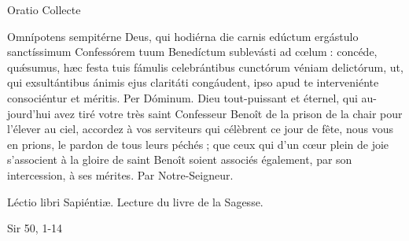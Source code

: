 \begin{paracol}{2}
Oratio
\switchcolumn
Collecte
\switchcolumn*

Omnípotens sempitérne Deus,  qui hodiérna die carnis edúctum ergástulo sanctíssimum Confessórem tuum Benedíctum sublevásti ad cœlum : concéde, quǽsumus, hæc festa tuis fámulis celebrántibus cunctórum véniam delictórum, ut, qui exsultántibus ánimis ejus claritáti congáudent, ipso apud te interveniénte consociéntur et méritis. Per Dóminum.
\switchcolumn
Dieu tout-puissant et éternel, qui au- jourd’hui avez tiré votre très saint Confesseur Benoît de la prison de la chair pour l’élever au ciel, accordez à vos serviteurs qui célèbrent ce jour de fête, nous vous en prions, le pardon de tous leurs péchés ; que ceux qui d’un cœur plein de joie s’associent à la gloire de saint Benoît soient associés également, par son intercession, à ses mérites. Par Notre-Seigneur.
\switchcolumn*

Léctio libri Sapiéntiæ.
\switchcolumn
Lecture du livre de la Sagesse.
\switchcolumn*

Sir 50, 1-14
\switchcolumn

\switchcolumn*


\end{paracol}

